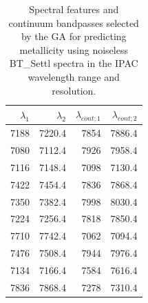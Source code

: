 \begin{table}
\begin{center}
\begin{tabular}{rrrr}
  \hline
  $\lambda_1$ & $\lambda_2$ & $\lambda_{cont;1}$ & $\lambda_{cont;2} $ \\ 
  \hline
7188 & 7220.4 &	7854 & 7886.4 \\ 
7080 & 7112.4 &	7926 & 7958.4 \\
7116 & 7148.4 &	7098 & 7130.4 \\
7422 & 7454.4 &	7836 & 7868.4 \\
7350 & 7382.4 &	7998 & 8030.4 \\
7224 & 7256.4 &	7818 & 7850.4 \\
7710 & 7742.4 &	7062 & 7094.4 \\
7476 & 7508.4 &	7944 & 7976.4 \\
7134 & 7166.4 &	7584 & 7616.4 \\
7836 & 7868.4 &	7278 & 7310.4 \\
\hline
\end{tabular}
\caption {Spectral features and continuum bandpasses selected by the
  GA for predicting metallicity using noiseless BT\_Settl spectra in
  the IPAC wavelength range and resolution.} \label{tab:ipac-met-noiseless}
\end{center}
\end{table}

